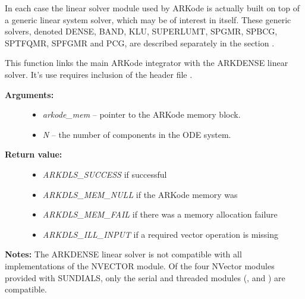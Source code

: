 \documentclass[letterpaper,10pt,english]{sphinxmanual}
\begin{document}
In each case the linear solver module used by ARKode is actually built
on top of a generic linear system solver, which may be of interest in
itself. These generic solvers, denoted DENSE, BAND, KLU, SUPERLUMT,
SPGMR, SPBCG, SPTFQMR, SPFGMR and PCG, are described separately in the
section {\hyperref[linear_solvers/index:linearsolvers]{\emph{}}}.

\begin{fulllineitems}
\label{c_interface/User_callable:c.ARKDense}
This function links the main ARKode integrator with the ARKDENSE
linear solver.  It's use requires inclusion of the header file
.
\begin{description}
\item[{\textbf{Arguments:}}] \leavevmode\begin{itemize}
\item {} 
\emph{arkode\_mem} -- pointer to the ARKode memory block.

\item {} 
\emph{N} -- the number of components in the ODE system.

\end{itemize}

\item[{\textbf{Return value:}}] \leavevmode\begin{itemize}
\item {} 
\emph{ARKDLS\_SUCCESS}   if successful

\item {} 
\emph{ARKDLS\_MEM\_NULL}  if the ARKode memory was 

\item {} 
\emph{ARKDLS\_MEM\_FAIL}  if there was a memory allocation failure

\item {} 
\emph{ARKDLS\_ILL\_INPUT} if a required vector operation is missing

\end{itemize}

\end{description}

\textbf{Notes:}  The ARKDENSE linear solver is not compatible with
all implementations of the NVECTOR module. Of the four NVector
modules provided with SUNDIALS, only the serial and threaded
modules ({\hyperref[nvectors/NVector_Serial:nvectors-nvserial]{\emph{}}}, {\hyperref[nvectors/NVector_OpenMP:nvectors-openmp]{\emph{}}} and
{\hyperref[nvectors/NVector_Pthreads:nvectors-pthreads]{\emph{}}}) are compatible.

\end{fulllineitems}
\end{document}
